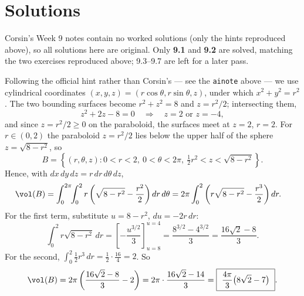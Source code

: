 \section{Solutions}
\label{sec:week09_solutions}

\begin{ainote}
Corsin's Week 9 notes contain no worked solutions (only the hints reproduced above), so all
solutions here are original. Only \textbf{9.1} and \textbf{9.2} are solved, matching the two
exercises reproduced above; 9.3--9.7 are left for a later pass.
\end{ainote}

\begin{exercisesolution}
\label{ex:solution_9.1}
Following the official hint rather than Corsin's --- see the \texttt{ainote} above --- we use
cylindrical coordinates $(x,y,z) = (r\cos\theta,r\sin\theta,z)$, under which $x^2+y^2=r^2$.
The two bounding surfaces become $r^2+z^2=8$ and $z = r^2/2$; intersecting them,
\[z^2+2z-8 = 0 \quad\Longrightarrow\quad z = 2 \text{ or } z=-4,\]
and since $z=r^2/2\geq0$ on the paraboloid, the surfaces meet at $z=2$, $r=2$. For
$r \in (0,2)$ the paraboloid $z=r^2/2$ lies below the upper half of the sphere
$z=\sqrt{8-r^2}$, so
\[B = \left\{(r,\theta,z) : 0<r<2,\ 0<\theta<2\pi,\ \tfrac12r^2 < z < \sqrt{8-r^2}\right\}.\]
Hence, with $dx\,dy\,dz = r\,dr\,d\theta\,dz$,
\[
\begin{aligned}
\vol(B) &= \int_0^{2\pi}\!\!\int_0^2 r\left(\sqrt{8-r^2} - \frac{r^2}{2}\right)dr\,d\theta
  = 2\pi\int_0^2 \left(r\sqrt{8-r^2} - \frac{r^3}{2}\right)dr.
\end{aligned}
\]
For the first term, substitute $u = 8-r^2$, $du=-2r\,dr$:
\[\int_0^2 r\sqrt{8-r^2}\,dr = \left[-\frac{u^{3/2}}{3}\right]_{u=8}^{u=4}
  = \frac{8^{3/2}-4^{3/2}}{3} = \frac{16\sqrt2-8}{3}.\]
For the second, $\int_0^2 \tfrac12 r^3\,dr = \tfrac12\cdot\tfrac{16}{4} = 2$. So
\[\vol(B) = 2\pi\left(\frac{16\sqrt2-8}{3} - 2\right) = 2\pi\cdot\frac{16\sqrt2-14}{3}
  = \boxed{\ \frac{4\pi}{3}\big(8\sqrt2-7\big)\ }.\]
\end{exercisesolution}

